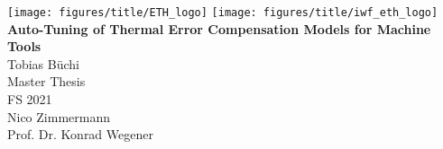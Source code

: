 \documentclass[paper=a4,twoside=true,fontsize=11pt,numbers=noendperiod,chapterprefix=false]{scrbook}
\begin{document}
%


\newcommand{\mykeyword}[0]{my long text}
\newcommand{\chpref}[1]{Chapter \ref{#1}}
\newcommand{\secref}[1]{Section \ref{#1}}
\newcommand{\figref}[1]{Figure \ref{#1}}
\newcommand{\tabref}[1]{Table \ref{#1}}
\newcommand{\apxref}[1]{Appendix \ref{#1}}

\setcounter{page}{-1}  %
\begin{titlepage}
	\topmargin -3.8cm
	\oddsidemargin 0.0cm
	\evensidemargin 0.0cm
	\centering
	\texttt{[image: figures/title/ETH\_logo]} \hfill
	\texttt{[image: figures/title/iwf\_eth\_logo]} \\
	\vspace{7.2cm} %
	\Huge
	\textbf{\textsf{Auto-Tuning of Thermal Error Compensation Models for Machine Tools}} \\[2.0cm]
	\vspace{4.0cm} %
	\sffamily
	\Large
	Tobias Büchi
	\\[0.8cm]
	\large
	Master Thesis
	\\
	FS 2021
	\\[0.8cm] %
	Nico Zimmermann 
	\\[0.5cm]
	Prof. Dr. Konrad Wegener
	\vfill
\end{titlepage}
\clearemptydoublepage
\end{document}

